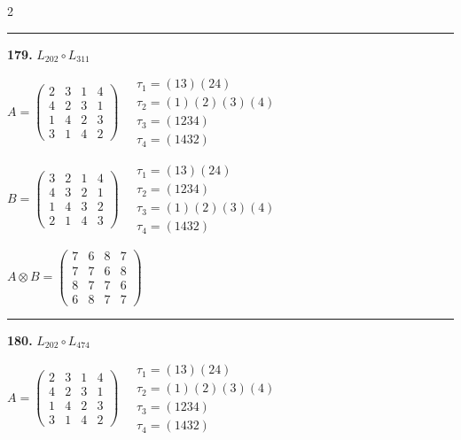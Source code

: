 \begin{multicols}{2}
\vspace{0.3em}
\hrule
\vspace{0.3em}

\noindent\textbf{179.} $L_{202} \circ L_{311}$

$A = \begin{pmatrix} 2 & 3 & 1 & 4 \\ 4 & 2 & 3 & 1 \\ 1 & 4 & 2 & 3 \\ 3 & 1 & 4 & 2 \end{pmatrix} \quad \begin{matrix} \tau_{1}=(1 3)(2 4) \\ \tau_{2}=(1)(2)(3)(4) \\ \tau_{3}=(1 2 3 4) \\ \tau_{4}=(1 4 3 2) \end{matrix}$

$B = \begin{pmatrix} 3 & 2 & 1 & 4 \\ 4 & 3 & 2 & 1 \\ 1 & 4 & 3 & 2 \\ 2 & 1 & 4 & 3 \end{pmatrix} \quad \begin{matrix} \tau_{1}=(1 3)(2 4) \\ \tau_{2}=(1 2 3 4) \\ \tau_{3}=(1)(2)(3)(4) \\ \tau_{4}=(1 4 3 2) \end{matrix}$

$A \otimes B = \begin{pmatrix} 7 & 6 & 8 & 7 \\ 7 & 7 & 6 & 8 \\ 8 & 7 & 7 & 6 \\ 6 & 8 & 7 & 7 \end{pmatrix}$

\vspace{0.3em}
\hrule
\vspace{0.3em}

\noindent\textbf{180.} $L_{202} \circ L_{474}$

$A = \begin{pmatrix} 2 & 3 & 1 & 4 \\ 4 & 2 & 3 & 1 \\ 1 & 4 & 2 & 3 \\ 3 & 1 & 4 & 2 \end{pmatrix} \quad \begin{matrix} \tau_{1}=(1 3)(2 4) \\ \tau_{2}=(1)(2)(3)(4) \\ \tau_{3}=(1 2 3 4) \\ \tau_{4}=(1 4 3 2) \end{matrix}$


\end{multicols}
